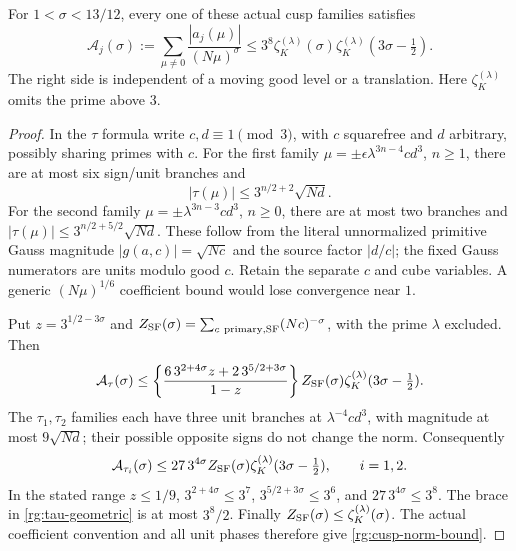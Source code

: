 \begin{proposition}\label{rg:cusp-norm}
For \(1<\sigma<13/12\), every one of these actual cusp families satisfies
\begin{equation}\label{rg:cusp-norm-bound}
 \mathcal A_j(\sigma):=
   \sum_{\mu\ne0}\frac{|a_j(\mu)|}{(N\mu)^\sigma}
 \le3^8\zeta_K^{(\lambda)}(\sigma)
                      \zeta_K^{(\lambda)}(3\sigma-\tfrac12).
\end{equation}
The right side is independent of a moving good level or a translation.
Here \(\zeta_K^{(\lambda)}\) omits the prime above \(3\).
\end{proposition}
\begin{proof}
In the \(\tau\) formula write \(c,d\equiv1\pmod3\), with \(c\)
squarefree and \(d\) arbitrary, possibly sharing primes with \(c\).
For the first family
\(\mu=\pm\epsilon\lambda^{3n-4}cd^3\), \(n\ge1\),
there are at most six sign/unit branches and
\[
 |\tau(\mu)|\le3^{n/2+2}\sqrt{Nd}.
\]
For the second family
\(\mu=\pm\lambda^{3n-3}cd^3\), \(n\ge0\),
there are at most two branches and
\(|\tau(\mu)|\le3^{n/2+5/2}\sqrt{Nd}\).
These follow from the literal unnormalized primitive Gauss magnitude
\(|g(a,c)|=\sqrt{Nc}\) and the source factor \(|d/c|\);
the fixed Gauss numerators are units modulo good \(c\).
Retain the separate \(c\) and cube variables. A generic
\((N\mu)^{1/6}\) coefficient bound would lose convergence near \(1\).

Put \(z=3^{1/2-3\sigma}\) and
\(Z_{\rm SF}(\sigma)=\sum_{c\ {\rm primary,SF}}(Nc)^{-\sigma}\),
with the prime \(\lambda\) excluded. Then
\begin{equation}\label{rg:tau-geometric}
 \begin{split}
 \mathcal A_\tau(\sigma)\le
 \left\{\frac{6\,3^{2+4\sigma}z+
                         2\,3^{5/2+3\sigma}}{1-z}\right\}
 Z_{\rm SF}(\sigma)\zeta_K^{(\lambda)}(3\sigma-\tfrac12).
 \end{split}
\end{equation}
The \(\tau_1,\tau_2\) families each have three unit branches at
\(\lambda^{-4}cd^3\), with magnitude at most \(9\sqrt{Nd}\);
their possible opposite signs do not change the norm. Consequently
\begin{equation}\label{rg:tau12-geometric}
 \mathcal A_{\tau_i}(\sigma)
 \le27\,3^{4\sigma} Z_{\rm SF}(\sigma)
                    \zeta_K^{(\lambda)}(3\sigma-\tfrac12),
 \qquad i=1,2 .
\end{equation}
In the stated range \(z\le1/9\),
\(3^{2+4\sigma}\le3^7\),
\(3^{5/2+3\sigma}\le3^6\), and
\(27\,3^{4\sigma}\le3^8\).
The brace in \eqref{rg:tau-geometric} is at most \(3^8/2\).
Finally \(Z_{\rm SF}(\sigma)\le\zeta_K^{(\lambda)}(\sigma)\).
The actual coefficient convention and all unit phases therefore
give \eqref{rg:cusp-norm-bound}.
\end{proof}

